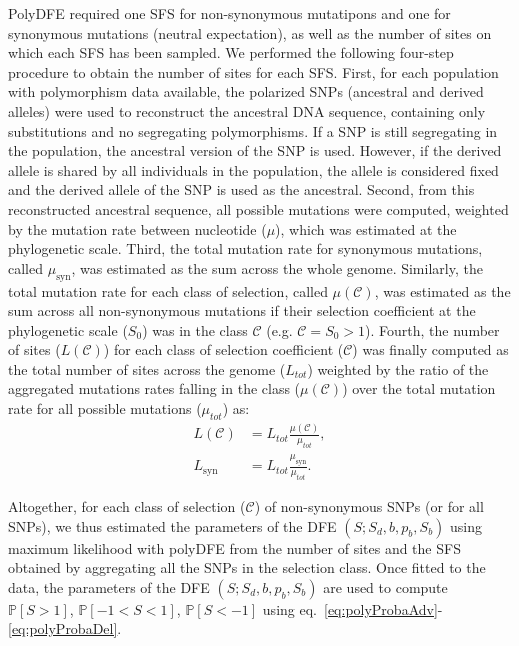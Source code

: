\documentclass{article}
\newcommand{\proba}{\mathbb{P}}
\newcommand{\Sphy}{S_{0}}
\newcommand{\Sphyclass}{\mathcal{C}}
\newcommand{\divAdv}{ \Sphy > 1}
\newcommand{\Spop}{S}
\newcommand{\polyDel}{\Spop < -1}
\newcommand{\polyNeutral}{-1 < \Spop < 1}
\newcommand{\polyAdv}{ \Spop > 1}
\newcommand{\PpolyDel}{\proba \left[ \polyDel \right]}
\newcommand{\PpolyNeutral}{\proba \left[ \polyNeutral \right]}
\newcommand{\PpolyAdv}{\proba \left[ \polyAdv \right]}
\begin{document}
    PolyDFE required one SFS for non-synonymous mutatipons and one for synonymous mutations (neutral expectation), as well as the number of sites on which each SFS has been sampled.
    We performed the following four-step procedure to obtain the number of sites for each SFS.
    First, for each population with polymorphism data available, the polarized SNPs (ancestral and derived alleles) were used to reconstruct the ancestral DNA sequence, containing only substitutions and no segregating polymorphisms.
    If a SNP is still segregating in the population, the ancestral version of the SNP is used.
    However, if the derived allele is shared by all individuals in the population, the allele is considered fixed and the derived allele of the SNP is used as the ancestral.
    Second, from this reconstructed ancestral sequence, all possible mutations were computed, weighted by the mutation rate between nucleotide ($\mu$), which was estimated at the phylogenetic scale.
    Third, the total mutation rate for synonymous mutations, called $\mu_{\textrm{syn}}$, was estimated as the sum across the whole genome.
    Similarly, the total mutation rate for each class of selection, called  $\mu\left( \Sphyclass \right)$, was estimated as the sum across all non-synonymous mutations if their selection coefficient at the phylogenetic scale ($\Sphy$) was in the class $\Sphyclass$ (e.g. $\Sphyclass = \divAdv$).
    Fourth, the number of sites ($L \left( \Sphyclass \right)$) for each class of selection coefficient ($\Sphyclass$) was finally computed as the total number of sites across the genome ($L_{tot}$) weighted by the ratio of the aggregated mutations rates falling in the class ($\mu\left( \Sphyclass \right)$) over the total mutation rate for all possible mutations ($\mu_{tot}$) as:
    \begin{align}
        L \left( \Sphyclass \right) &= L_{tot} \frac{\mu\left( \Sphyclass \right)}{\mu_{tot}}, \\
        L_{\textrm{syn}} &= L_{tot} \frac{\mu_{\textrm{syn}}}{\mu_{tot}}.
    \end{align}

    Altogether, for each class of selection ($\Sphyclass$) of non-synonymous SNPs (or for all SNPs), we thus estimated the parameters of the DFE $\left( \Spop; \Spop_d , b, p_b, \Spop_b \right)$ using maximum likelihood with polyDFE from the number of sites and the SFS obtained by aggregating all the SNPs in the selection class.
    Once fitted to the data, the parameters of the DFE $\left( \Spop; \Spop_d , b, p_b, \Spop_b \right)$ are used to compute $\PpolyAdv$, $\PpolyNeutral$, $\PpolyDel$ using eq.~\ref{eq:polyProbaAdv}-\ref{eq:polyProbaDel}.
\end{document}
